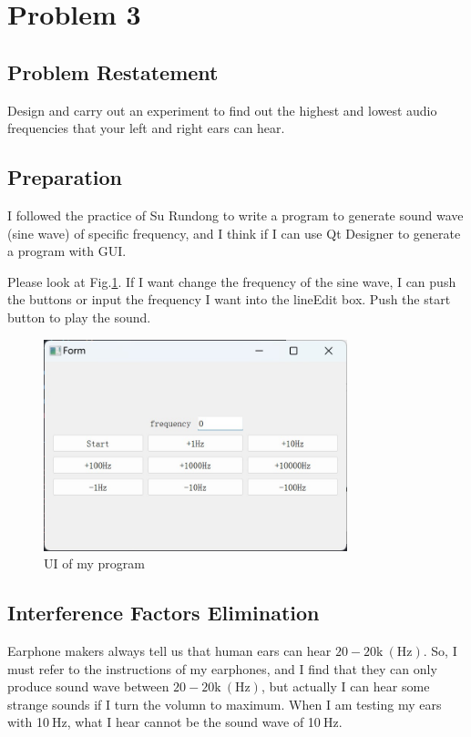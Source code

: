 \documentclass{article}
\begin{document}
\section{Problem 3}
\subsection{Problem Restatement}
Design and carry out an experiment to find out the highest and lowest audio frequencies that your left and right ears can
hear.
\subsection{Preparation}
I followed the practice of Su Rundong to write a program to generate sound wave (sine wave) of specific frequency, and I think if I can use Qt Designer to generate a program with GUI.

Please look at Fig.\ref{UI}. If I want change the frequency of the sine wave, I can push the buttons or input the frequency I want into the lineEdit box. Push the start button to play the sound.

\begin{figure}[htbp]
    \centering
    \includegraphics[keepaspectratio,width=250pt]{FreqWindow.jpg}
    \caption{UI of my program}\label{UI}
\end{figure}

\subsection{Interference Factors Elimination}
Earphone makers always tell us that human ears can hear $20-20\mathrm{k}~\mathrm{(Hz)}$. So, I must refer to the instructions of my earphones, and I find that they can only produce sound wave between $20-20\mathrm{k}~\mathrm{(Hz)}$, but actually I can hear some strange sounds if I turn the volumn to maximum. When I am testing my ears with 10$~\mathrm{Hz}$, what I hear cannot be the sound wave of 10$~\mathrm{Hz}$. 
\end{document}
